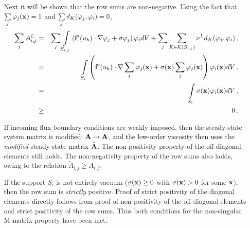 \begin{prf}
Next it will be shown that the row sums are non-negative.
Using the fact that $\sum\limits_j\varphi_j(\mathbf{x})=1$ and
$\sum\limits_j d_K(\varphi_j,\varphi_i)=0$,
\begin{eqnarray*}
   \sum\limits_j A^L_{i,j} & = & \sum\limits_j \int\limits_{S_{i,j}}
      \left(\mathbf{f}'(u_h)
        \cdot\nabla\varphi_j +
      \sigma\varphi_j\right)\varphi_i dV +
      \sum\limits_j\sum\limits_{K\in\mathcal{K}(S_{i,j})}\nu^L
        d_K(\varphi_j,\varphi_i)
      \,,\\
   & = & \int\limits_{S_i}\left(
      \mathbf{f}'(u_h)\cdot
      \nabla\sum\limits_j\varphi_j(\mathbf{x}) +
      \sigma(\mathbf{x})\sum\limits_j\varphi_j(\mathbf{x})\right)
      \varphi_i(\mathbf{x}) dV \,,\\
   \label{eq:rowsum} & = & \int\limits_{S_i}\sigma(\mathbf{x})\varphi_i(\mathbf{x}) dV
     \,,\\
   & \ge & 0 \,.
\end{eqnarray*}
\begin{rmk}
  If incoming flux boundary conditions are weakly imposed, then the steady-state
  system matrix is modified: $\mathbf{A}\rightarrow\tilde{\mathbf{A}}$, and the low-order
  viscosity then uses the \emph{modified} steady-state matrix $\tilde{\mathbf{A}}$.
  The non-positivity property of the off-diagonal elements still holds.
  The non-negativity property of the row sums also holds, owing to the relation
  $\tilde{A}_{i,j} \geq A_{i,j}$.
\end{rmk}
If the support $S_i$ is not entirely vacuum ($\sigma(\mathbf{x}) \ge 0$ with $\sigma(\mathbf{x}) > 0$ for some $\mathbf{x}$), then the
row sum is \emph{strictly} positive.
Proof of strict positivity of the diagonal elements directly follows from proof
of non-positivity of the off-diagonal elements and strict positivity of the
row sums. Thus both conditions for the non-singular M-matrix property have
been met.

\end{prf}
